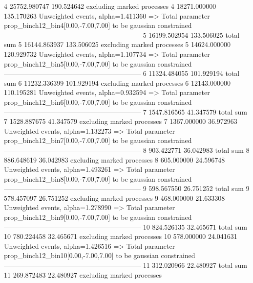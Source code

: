 4          25752.980747    190.524642      excluding marked processes    
4          18271.000000    135.170263      Unweighted events, alpha=1.411360
  => Total parameter prop_binch12_bin4[0.00,-7.00,7.00] to be gaussian constrained
------------------------------------------------------------
5          16199.502954    133.506025      total sum                     
5          16144.863937    133.506025      excluding marked processes    
5          14624.000000    120.929732      Unweighted events, alpha=1.107734
  => Total parameter prop_binch12_bin5[0.00,-7.00,7.00] to be gaussian constrained
------------------------------------------------------------
6          11324.484055    101.929194      total sum                     
6          11232.336399    101.929194      excluding marked processes    
6          12143.000000    110.195281      Unweighted events, alpha=0.932594
  => Total parameter prop_binch12_bin6[0.00,-7.00,7.00] to be gaussian constrained
------------------------------------------------------------
7          1547.816565     41.347579       total sum                     
7          1528.887675     41.347579       excluding marked processes    
7          1367.000000     36.972963       Unweighted events, alpha=1.132273
  => Total parameter prop_binch12_bin7[0.00,-7.00,7.00] to be gaussian constrained
------------------------------------------------------------
8          903.422771      36.042983       total sum                     
8          886.648619      36.042983       excluding marked processes    
8          605.000000      24.596748       Unweighted events, alpha=1.493261
  => Total parameter prop_binch12_bin8[0.00,-7.00,7.00] to be gaussian constrained
------------------------------------------------------------
9          598.567550      26.751252       total sum                     
9          578.457097      26.751252       excluding marked processes    
9          468.000000      21.633308       Unweighted events, alpha=1.278990
  => Total parameter prop_binch12_bin9[0.00,-7.00,7.00] to be gaussian constrained
------------------------------------------------------------
10         824.526135      32.465671       total sum                     
10         780.224458      32.465671       excluding marked processes    
10         578.000000      24.041631       Unweighted events, alpha=1.426516
  => Total parameter prop_binch12_bin10[0.00,-7.00,7.00] to be gaussian constrained
------------------------------------------------------------
11         312.020966      22.480927       total sum                     
11         269.872483      22.480927       excluding marked processes    
